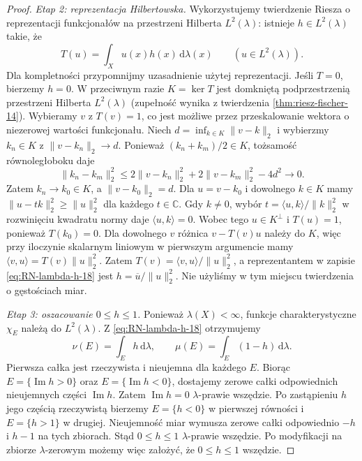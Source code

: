 \begin{proof}
\emph{Etap 2: reprezentacja Hilbertowska.}
Wykorzystujemy twierdzenie Riesza o reprezentacji
funkcjonałów na przestrzeni Hilberta $L^2(\lambda)$:
istnieje $h\in L^2(\lambda)$ takie, że
\begin{equation}\label{eq:RN-lambda-h-18}
T(u)=\int_Xu(x)h(x)\,\mathrm d\lambda(x)
\qquad(u\in L^2(\lambda)).
\end{equation}
Dla kompletności przypomnijmy uzasadnienie użytej
reprezentacji. Jeśli $T=0$, bierzemy $h=0$.
W przeciwnym razie $K=\ker T$ jest domkniętą
podprzestrzenią przestrzeni Hilberta $L^2(\lambda)$
(zupełność wynika z twierdzenia \ref{thm:riesz-fischer-14}).
Wybieramy $v$ z $T(v)=1$, co jest możliwe przez przeskalowanie
wektora o niezerowej wartości funkcjonału. Niech
$d=\inf_{k\in K}\|v-k\|_2$ i wybierzmy $k_n\in K$
z $\|v-k_n\|_2\to d$. Ponieważ $(k_n+k_m)/2\in K$,
tożsamość równoległoboku daje
\[
 \|k_n-k_m\|_2^2
 \le 2\|v-k_n\|_2^2+2\|v-k_m\|_2^2-4d^2\to0.
\]
Zatem $k_n\to k_0\in K$, a $\|v-k_0\|_2=d$.
Dla $u=v-k_0$ i dowolnego $k\in K$ mamy
$\|u-tk\|_2^2\ge\|u\|_2^2$ dla każdego $t\in\mathbb C$.
Gdy $k\ne0$, wybór $t=\langle u,k\rangle/\|k\|_2^2$
w rozwinięciu kwadratu normy daje $\langle u,k\rangle=0$.
Wobec tego $u\in K^\perp$ i $T(u)=1$, ponieważ $T(k_0)=0$.
Dla dowolnego $v$ różnica $v-T(v)u$ należy do $K$,
więc przy iloczynie skalarnym liniowym w pierwszym
argumencie mamy
$\langle v,u\rangle=T(v)\|u\|_2^2$.
Zatem $T(v)=\langle v,u\rangle/\|u\|_2^2$,
a reprezentantem w zapisie \eqref{eq:RN-lambda-h-18}
jest $h=\overline u/\|u\|_2^2$.
Nie użyliśmy w tym miejscu twierdzenia o gęstościach miar.

\emph{Etap 3: oszacowanie $0\le h\le1$.}
Ponieważ $\lambda(X)<\infty$, funkcje charakterystyczne $\chi_E$
należą do $L^2(\lambda)$. Z \eqref{eq:RN-lambda-h-18}
otrzymujemy
\begin{equation}\label{eq:RN-mu-nu-h-18}
\nu(E)=\int_Eh\,\mathrm d\lambda,\qquad
\mu(E)=\int_E(1-h)\,\mathrm d\lambda.
\end{equation}
Pierwsza całka jest rzeczywista i nieujemna dla
każdego $E$. Biorąc $E=\{\operatorname{Im}h>0\}$
oraz $E=\{\operatorname{Im}h<0\}$, dostajemy zerowe
całki odpowiednich nieujemnych części $\operatorname{Im}h$.
Zatem $\operatorname{Im}h=0$ $\lambda$-prawie wszędzie.
Po zastąpieniu $h$ jego częścią rzeczywistą bierzemy
$E=\{h<0\}$ w pierwszej równości i $E=\{h>1\}$ w drugiej.
Nieujemność miar wymusza zerowe całki odpowiednio
$-h$ i $h-1$ na tych zbiorach. Stąd $0\le h\le1$
$\lambda$-prawie wszędzie.
Po modyfikacji na zbiorze $\lambda$-zerowym możemy
więc założyć, że $0\le h\le1$ wszędzie.


\end{proof}
